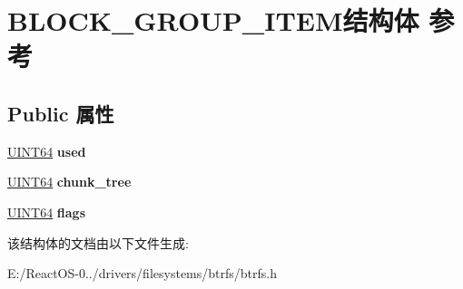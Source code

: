 \hypertarget{struct_b_l_o_c_k___g_r_o_u_p___i_t_e_m}{}\section{B\+L\+O\+C\+K\+\_\+\+G\+R\+O\+U\+P\+\_\+\+I\+T\+E\+M结构体 参考}
\label{struct_b_l_o_c_k___g_r_o_u_p___i_t_e_m}
\subsection*{Public 属性}
\begin{DoxyCompactItemize}
\item 
\mbox{\label{struct_b_l_o_c_k___g_r_o_u_p___i_t_e_m_ac4f879c8829a768a2231d83c7a3f1f2c}} 
\hyperlink{_processor_bind_8h_a57be03562867144161c1bfee95ca8f7c}{U\+I\+N\+T64} {\bfseries used}
\item 
\mbox{\label{struct_b_l_o_c_k___g_r_o_u_p___i_t_e_m_adae8690b734841be03e1904e6fee3be6}} 
\hyperlink{_processor_bind_8h_a57be03562867144161c1bfee95ca8f7c}{U\+I\+N\+T64} {\bfseries chunk\+\_\+tree}
\item 
\mbox{\label{struct_b_l_o_c_k___g_r_o_u_p___i_t_e_m_a100a2d1f390bdc62c5ee033408b5c86b}} 
\hyperlink{_processor_bind_8h_a57be03562867144161c1bfee95ca8f7c}{U\+I\+N\+T64} {\bfseries flags}
\end{DoxyCompactItemize}


该结构体的文档由以下文件生成\+:\begin{DoxyCompactItemize}
\item 
E\+:/\+React\+O\+S-\/0../drivers/filesystems/btrfs/btrfs.\+h\end{DoxyCompactItemize}
